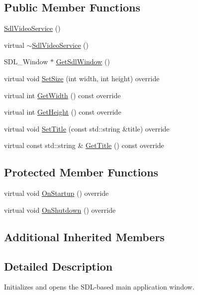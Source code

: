\subsection*{Public Member Functions}
\begin{DoxyCompactItemize}
\item 
\hyperlink{classastu_1_1SdlVideoService_a21f04798e41b0c5c083acc1eefcbb5c1}{Sdl\+Video\+Service} ()
\item 
virtual \hyperlink{classastu_1_1SdlVideoService_a5ab48fd8569c517151099d71a86cc0b5}{$\sim$\+Sdl\+Video\+Service} ()
\item 
S\+D\+L\+\_\+\+Window $\ast$ \hyperlink{classastu_1_1SdlVideoService_af0282450cc95c0cbc2a6add84603dd7a}{Get\+Sdl\+Window} ()
\item 
virtual void \hyperlink{classastu_1_1SdlVideoService_a1c8d729ef42024bc0cc5065ecc6631c8}{Set\+Size} (int width, int height) override
\item 
virtual int \hyperlink{classastu_1_1SdlVideoService_a45c3181611e718bcfe44862baed6d520}{Get\+Width} () const override
\item 
virtual int \hyperlink{classastu_1_1SdlVideoService_a76d0f56254c9545d4d9762349133d4af}{Get\+Height} () const override
\item 
virtual void \hyperlink{classastu_1_1SdlVideoService_aad3c873db481dd622d6ddcea70b279af}{Set\+Title} (const std\+::string \&title) override
\item 
virtual const std\+::string \& \hyperlink{classastu_1_1SdlVideoService_ad6ee7f7a409960e91ddd77bbcea6432f}{Get\+Title} () const override
\end{DoxyCompactItemize}
\subsection*{Protected Member Functions}
\begin{DoxyCompactItemize}
\item 
virtual void \hyperlink{classastu_1_1SdlVideoService_add229ac2af59a4aea090e4de4c67e530}{On\+Startup} () override
\item 
virtual void \hyperlink{classastu_1_1SdlVideoService_a6d6085e9ff213c5d41546d604ff53e92}{On\+Shutdown} () override
\end{DoxyCompactItemize}
\subsection*{Additional Inherited Members}


\subsection{Detailed Description}
Initializes and opens the S\+D\+L-\/based main application window.

